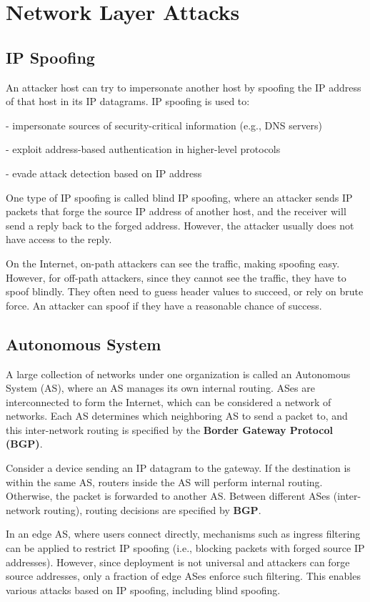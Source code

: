\section{Network Layer Attacks}

\subsection{IP Spoofing}
An attacker host can try to impersonate another host by spoofing the IP address of that host in its IP datagrams. IP spoofing is used to:

- impersonate sources of security-critical information (e.g., DNS servers) 

- exploit address-based authentication in higher-level protocols 

- evade attack detection based on IP address 

One type of IP spoofing is called blind IP spoofing, where an attacker sends IP packets that forge the source IP address of another host, and the receiver will send a reply back to the forged address. However, the attacker usually does not have access to the reply. 

On the Internet, on-path attackers can see the traffic, making spoofing easy. However, for off-path attackers, since they cannot see the traffic, they have to spoof blindly. They often need to guess header values to succeed, or rely on brute force. An attacker can spoof if they have a reasonable chance of success. 

\subsection{Autonomous System}
A large collection of networks under one organization is called an Autonomous System (AS), where an AS manages its own internal routing. ASes are interconnected to form the Internet, which can be considered a network of networks. Each AS determines which neighboring AS to send a packet to, and this inter-network routing is specified by the \textbf{Border Gateway Protocol (BGP)}.

Consider a device sending an IP datagram to the gateway. If the destination is within the same AS, routers inside the AS will perform internal routing. Otherwise, the packet is forwarded to another AS. Between different ASes (inter-network routing), routing decisions are specified by \textbf{BGP}. 

In an edge AS, where users connect directly, mechanisms such as ingress filtering can be applied to restrict IP spoofing (i.e., blocking packets with forged source IP addresses). However, since deployment is not universal and attackers can forge source addresses, only a fraction of edge ASes enforce such filtering. This enables various attacks based on IP spoofing, including blind spoofing. 

